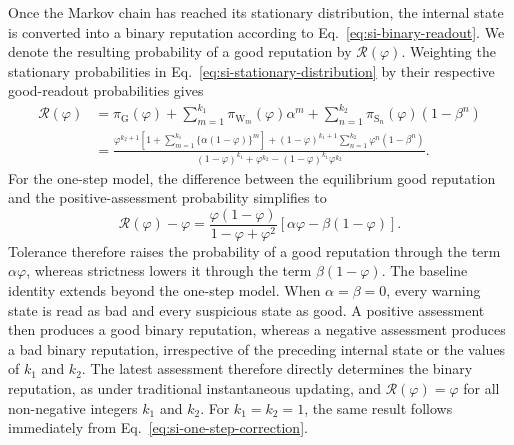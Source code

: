 \documentclass[fleqn,10pt]{wlscirep}
\begin{document}
Once the Markov chain has reached its stationary distribution, the internal state is converted into a binary reputation according to Eq.~\eqref{eq:si-binary-readout}. We denote the resulting probability of a good reputation by $\mathcal R(\varphi)$. Weighting the stationary probabilities in Eq.~\eqref{eq:si-stationary-distribution} by their respective good-readout probabilities gives
\begin{equation}
\begin{aligned}
\mathcal R(\varphi)
&=\pi_{\mathrm{G}}(\varphi)+\sum_{m=1}^{k_1}\pi_{\mathrm{W}_m}(\varphi)\alpha^m +\sum_{n=1}^{k_2}\pi_{\mathrm{S}_n}(\varphi)(1-\beta^n)\\
&=
\frac{\varphi^{k_2+1}\left[1+\displaystyle\sum_{m=1}^{k_1}\{\alpha(1-\varphi)\}^m\right]+(1-\varphi)^{k_1+1}\displaystyle\sum_{n=1}^{k_2}\varphi^n(1-\beta^n)}{(1-\varphi)^{k_1}+\varphi^{k_2}-(1-\varphi)^{k_1}\varphi^{k_2}}.
\end{aligned}
\label{eq:si-reputation-transform}
\end{equation}
For the one-step model, the difference between the equilibrium good reputation and the positive-assessment probability simplifies to
\begin{equation}
\mathcal R(\varphi)-\varphi
=\frac{\varphi(1-\varphi)}{1-\varphi+\varphi^2}
\left[\alpha\varphi-\beta(1-\varphi)\right].
\label{eq:si-one-step-correction}
\end{equation}
Tolerance therefore raises the probability of a good reputation through the term $\alpha\varphi$, whereas strictness lowers it through the term $\beta(1-\varphi)$. The baseline identity extends beyond the one-step model. When $\alpha=\beta=0$, every warning state is read as bad and every suspicious state as good. A positive assessment then produces a good binary reputation, whereas a negative assessment produces a bad binary reputation, irrespective of the preceding internal state or the values of $k_1$ and $k_2$. The latest assessment therefore directly determines the binary reputation, as under traditional instantaneous updating, and $\mathcal R(\varphi)=\varphi$ for all non-negative integers $k_1$ and $k_2$. For $k_1=k_2=1$, the same result follows immediately from Eq.~\eqref{eq:si-one-step-correction}.

\end{document}
